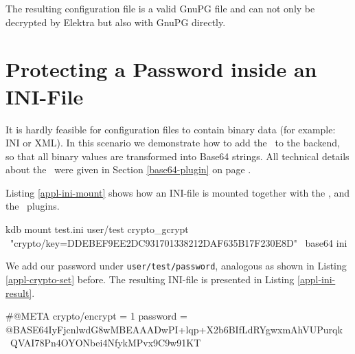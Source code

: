 The resulting configuration file is a valid GnuPG file and can not only be decrypted by Elektra but also with GnuPG directly.

\section{Protecting a Password inside an INI-File}

It is hardly feasible for configuration files to contain binary data (for example: INI or XML).
In this scenario we demonstrate how to add the \base ~to the backend, so that all binary values are transformed into Base64 strings.
All technical details about the \base ~were given in Section \ref{base64-plugin} on page \pageref{base64-plugin}.

Listing \ref{appl-ini-mount} shows how an INI-file is mounted together with the \crypto{}, and the \base ~plugins.

\begin{code}[label=appl-ini-mount,language=bash,caption={Mounting an INI-file with the \crypto{} and the \base{}}]
kdb mount test.ini user/test crypto_gcrypt \
    "crypto/key=DDEBEF9EE2DC931701338212DAF635B17F230E8D" \
    base64 ini
\end{code}

We add our password under \texttt{user/test/password}, analogous as shown in Listing \ref{appl-crypto-set} before.
The resulting INI-file is presented in Listing \ref{appl-ini-result}.

\begin{code}[label=appl-ini-result,language=bash,caption={Encrypted values in an INI-file}]
#@META crypto/encrypt = 1
password = @BASE64IyFjcnlwdG8wMBEAAADwPI+lqp+X2b6BIfLdRYgwxmAhVUPurqk \
QVAI78Pn4OYONbei4NfykMPvx9C9w91KT
\end{code}

